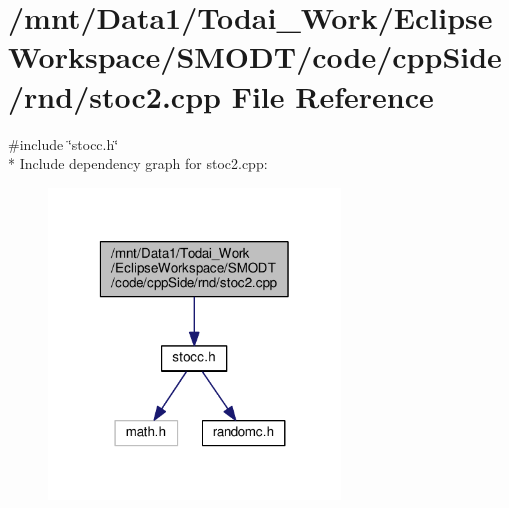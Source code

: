 \section{/mnt/\-Data1/\-Todai\-\_\-\-Work/\-Eclipse\-Workspace/\-S\-M\-O\-D\-T/code/cpp\-Side/rnd/stoc2.cpp File Reference}
\label{rnd_2stoc2_8cpp}
{\ttfamily \#include \char`\"{}stocc.\-h\char`\"{}}\\*
Include dependency graph for stoc2.\-cpp\-:
\nopagebreak
\begin{figure}[H]
\begin{center}
\leavevmode
\includegraphics[width=220pt]{rnd_2stoc2_8cpp__incl}
\end{center}
\end{figure}
